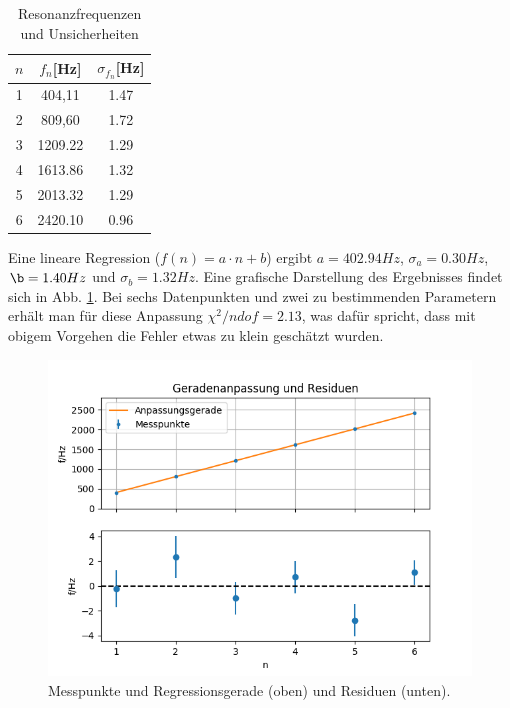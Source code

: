 \documentclass[12pt,a4paper]{article}
\begin{document}
\begin{table}
\begin{center}

\begin{tabular}{|c|c|c|}

\hline 
$n$ & $f_n$[Hz] & $\sigma_{f_n}$[Hz] \\ 
\hline 
1 & 404,11 & 1.47 \\ 
\hline 
2 & 809,60 &  1.72 \\ 
\hline 
3 & 1209.22 & 1.29 \\ 
\hline 
4 & 1613.86 & 1.32 \\ 
\hline 
5 &   2013.32 & 1.29 \\ 
\hline 
6 & 2420.10 &     0.96 \\ 
\hline
\end{tabular}
\caption{Resonanzfrequenzen und Unsicherheiten}
\label{resonanztabelle}
\end{center}
\end{table} 

Eine lineare Regression ($f(n)=a \cdot n+b$) ergibt $a=402.94 Hz$, $\sigma_a=0.30 Hz$, $\b=1.40 Hz$ und $\sigma_b=1.32 Hz$. Eine grafische Darstellung des Ergebnisses findet sich in Abb. \ref{fig:resonanzregression}.  Bei sechs Datenpunkten und zwei zu bestimmenden Parametern erhält man für diese Anpassung $\chi^2/ndof=2.13$, was dafür spricht, dass mit obigem Vorgehen die Fehler etwas zu klein geschätzt wurden.\\

\begin{figure}
	\includegraphics[width=\linewidth]{fitplot}
	\caption[Auswertung Resonanz]{Messpunkte und Regressionsgerade (oben) und
	Residuen (unten).}
	\label{fig:resonanzregression}
\end{figure}
\end{document}
